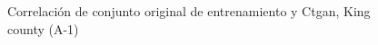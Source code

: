 \begin{figure}[H]
    \centering
    
    \caption{Correlación de conjunto original de entrenamiento y Ctgan, King county (A-1)}
    \label{pairwise-king county-a-1-ctgan}
\end{figure}